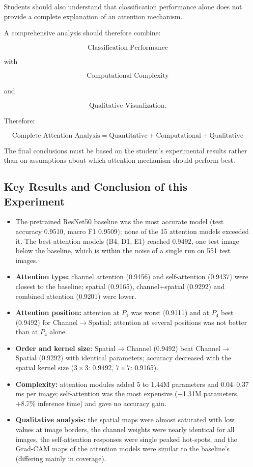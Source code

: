 \documentclass[10pt]{article}
\begin{document}
Students should also understand that classification performance alone does
not provide a complete explanation of an attention mechanism.

A comprehensive analysis should therefore combine:

\[
\boxed{
\text{Classification Performance}
}
\]

with

\[
\boxed{
\text{Computational Complexity}
}
\]

and

\[
\boxed{
\text{Qualitative Visualization}.
}
\]

Therefore:

\[
\boxed{
\text{Complete Attention Analysis}
=
\text{Quantitative}
+
\text{Computational}
+
\text{Qualitative}
}
\]

The final conclusions must be based on the student's experimental results
rather than on assumptions about which attention mechanism should perform
best.


\subsection*{Key Results and Conclusion of this Experiment}

\begin{itemize}
\item The pretrained ResNet50 baseline was the most accurate model (test accuracy 0.9510, macro F1 0.9509); none of the 15 attention models exceeded it. The best attention models (B4, D1, E1) reached 0.9492, one test image below the baseline, which is within the noise of a single run on 551 test images.
\item \textbf{Attention type:} channel attention (0.9456) and self-attention (0.9437) were closest to the baseline; spatial (0.9165), channel+spatial (0.9292) and combined attention (0.9201) were lower.
\item \textbf{Attention position:} attention at $P_1$ was worst (0.9111) and at $P_4$ best (0.9492) for Channel$\rightarrow$Spatial; attention at several positions was not better than at $P_4$ alone.
\item \textbf{Order and kernel size:} Spatial$\rightarrow$Channel (0.9492) beat Channel$\rightarrow$Spatial (0.9292) with identical parameters; accuracy decreased with the spatial kernel size ($3\times3$: 0.9492, $7\times7$: 0.9165).
\item \textbf{Complexity:} attention modules added 5 to 1.44M parameters and 0.04--0.37 ms per image; self-attention was the most expensive (+1.31M parameters, +8.7\% inference time) and gave no accuracy gain.
\item \textbf{Qualitative analysis:} the spatial maps were almost saturated with low values at image borders, the channel weights were nearly identical for all images, the self-attention responses were single peaked hot-spots, and the Grad-CAM maps of the attention models were similar to the baseline's (differing mainly in coverage).
\end{itemize}
\end{document}
